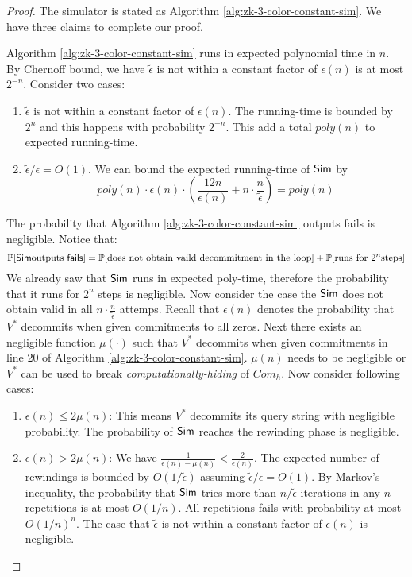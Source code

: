 \begin{proof}
The simulator is stated as Algorithm \ref{alg:zk-3-color-constant-sim}. We have three claims to complete our proof.
\begin{claim} Algorithm \ref{alg:zk-3-color-constant-sim} runs in expected polynomial time in $n$.
By Chernoff bound, we have $\widetilde{\epsilon}$ is not within a constant factor of $\epsilon(n)$ is at most $2^{-n}$.
Consider two cases:
\begin{enumerate}
\item $\widetilde{\epsilon}$ is not within a constant factor of $\epsilon(n)$.
	The running-time is bounded by $2^{n}$ and this happens with probability $2^{-n}$. This add a total $poly(n)$ to expected running-time.
\item $\widetilde{\epsilon}/\epsilon=O(1)$.
We can bound the expected running-time of ${\sf Sim}$ by
$$poly(n)\cdot\epsilon(n)\cdot(\frac{12n}{\epsilon(n)}+n\cdot\frac{n}{\widetilde{\epsilon}})=poly(n)$$
\end{enumerate}
\end{claim}
\begin{claim} The probability that Algorithm \ref{alg:zk-3-color-constant-sim} outputs {\sf fails} is negligible.
Notice that:
$$\mathop{\mathbb P\/}[{\sf Sim} \text{outputs \sf fails}]=\mathop{\mathbb P\/}[\text{does not obtain vaild decommitment in the loop}]+\mathop{\mathbb P\/}[\text{runs for }2^n\text{steps}]$$
We already saw that ${\sf Sim}$ runs in expected poly-time, therefore the probability that it runs for $2^n$ steps is negligible.
Now consider the case the ${\sf Sim}$ does not obtain valid in all $n\cdot\frac{n}{\widetilde{\epsilon}}$ attemps. Recall that $\epsilon(n)$ denotes the probability that $V^*$ decommits when given commitments to all zeros. Next there exists an negligible function $\mu(\cdot)$ such that $V^*$ decommits when given commitments in line 20 of Algorithm \ref{alg:zk-3-color-constant-sim}. $\mu(n)$ needs to be negligible or $V^*$ can be used to break {\it computationally-hiding} of $Com_h$. Now consider following cases:
\begin{enumerate}
\item $\epsilon(n)\leq 2\mu(n)$: This means $V^*$ decommits its query string with negligible probability. The probability of ${\sf Sim}$ reaches the rewinding phase is negligible.
\item $\epsilon(n)> 2\mu(n)$: We have $\frac{1}{\epsilon(n)-\mu(n)}<\frac{2}{\epsilon(n)}$. The expected number of rewindings is bounded by $O(1/\widetilde{\epsilon})$ assuming $\widetilde{\epsilon}/\epsilon=O(1)$. By Markov's inequality, the probability that ${\sf Sim}$ tries more than $n/\widetilde{\epsilon}$ iterations in any $n$ repetitions is at most $O(1/n)$. All repetitions fails with probability at most $O(1/n)^n$.
The case that $\widetilde{\epsilon}$ is not within a constant factor of $\epsilon(n)$ is negligible.
\end{enumerate}
\end{claim}


\end{proof}

